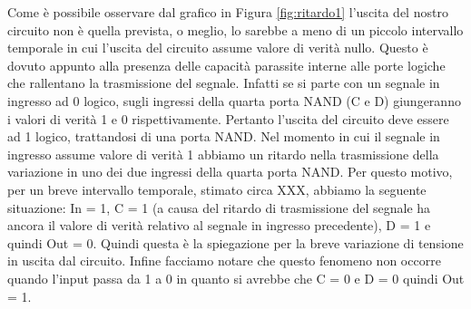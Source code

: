 Come è possibile osservare dal grafico in Figura \ref{fig:ritardo1} l'uscita del nostro circuito non è quella prevista, o meglio, lo sarebbe a meno di un piccolo intervallo temporale in cui l'uscita del circuito assume valore di verità nullo. Questo è dovuto appunto alla presenza delle capacità parassite interne alle porte logiche che rallentano la trasmissione del segnale. Infatti se si parte con un segnale in ingresso ad 0 logico, sugli ingressi della quarta porta NAND (C e D) giungeranno i valori di verità 1 e 0 rispettivamente. Pertanto l'uscita del circuito deve essere ad 1 logico, trattandosi di una porta NAND. Nel momento in cui il segnale in ingresso assume valore di verità 1 abbiamo un ritardo nella trasmissione della variazione in uno dei due ingressi della quarta porta NAND. Per questo motivo, per un breve intervallo temporale, stimato circa XXX, abbiamo la seguente situazione: In = 1, C = 1 (a causa del ritardo di trasmissione del segnale ha ancora il valore di verità relativo al segnale in ingresso precedente), D = 1 e quindi Out = 0. Quindi questa è la spiegazione per la breve variazione di tensione in uscita dal circuito. Infine facciamo notare che questo fenomeno non occorre quando l'input passa da 1 a 0 in quanto si avrebbe che C = 0 e D = 0 quindi Out = 1.





























